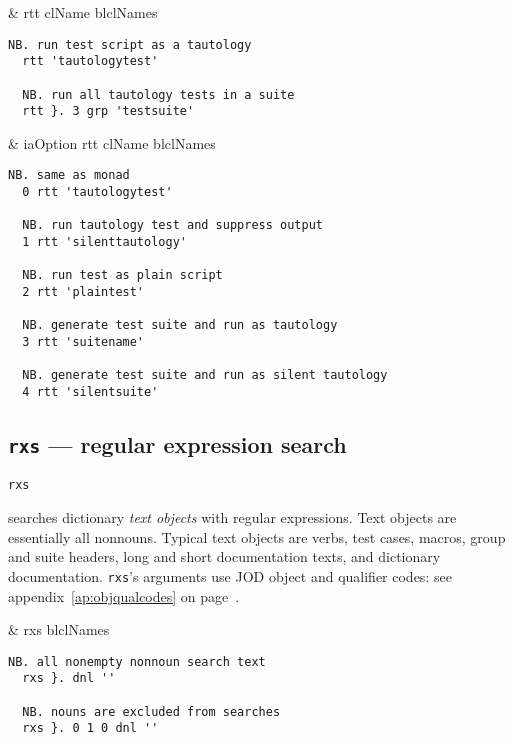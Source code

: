 \begin{wordhead}
\monad & rtt clName \argsep blclNames \\
\end{wordhead}
\begin{lstlisting}[frame=single,framerule=0pt] 
  NB. run test script as a tautology
  rtt 'tautologytest'    
  
  NB. run all tautology tests in a suite 
  rtt }. 3 grp 'testsuite'  
\end{lstlisting}  

\begin{wordhead}
\dyad & iaOption rtt clName \argsep blclNames \\
\end{wordhead}
\begin{lstlisting}[frame=single,framerule=0pt] 
  NB. same as monad
  0 rtt 'tautologytest'    
  
  NB. run tautology test and suppress output 
  1 rtt 'silenttautology'  
  
  NB. run test as plain script
  2 rtt 'plaintest'        
  
  NB. generate test suite and run as tautology 
  3 rtt 'suitename'  
   
  NB. generate test suite and run as silent tautology      
  4 rtt 'silentsuite'      
\end{lstlisting}   

\subsection{\texttt{rxs} --- regular expression search}\label{ss:rxs}

\hypertarget{il:rxs}{\texttt{rxs}} searches dictionary \emph{text objects} with regular expressions.
Text objects are essentially all nonnouns.  Typical text objects are verbs, test cases, macros,  group and suite headers, 
long and short documentation texts, and dictionary documentation.
\texttt{rxs}'s arguments use JOD object and qualifier codes: see appendix~\ref{ap:objqualcodes} on
page~\pageref{ap:objqualcodes}.

\begin{wordhead}
\monad & rxs blclNames \\
\end{wordhead}
\begin{lstlisting}[frame=single,framerule=0pt]
  NB. all nonempty nonnoun search text
  rxs }. dnl ''  
  
  NB. nouns are excluded from searches
  rxs }. 0 1 0 dnl ''  
\end{lstlisting}  

